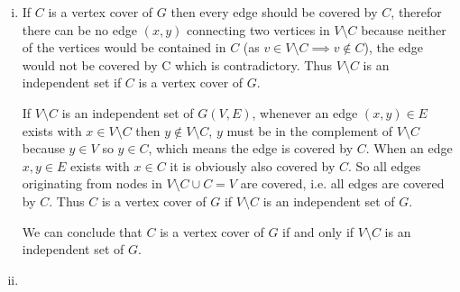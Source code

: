 \begin{enumerate}[(i)]
	\item If $C$ is a vertex cover of $G$ then every edge should be covered by $C$, therefor there can be no edge $(x,y)$ connecting two vertices in $V \setminus C$ because neither of the vertices would be contained in $C$ (as $v \in V \setminus C \implies v \not \in C$), the edge would not be covered by C which is contradictory. Thus $V \setminus C$ is an independent set if $C$ is a vertex cover of $G$.

If $V \setminus C$ is an independent set of $G(V,E)$, whenever an edge $(x,y) \in E$ exists with $x \in V \setminus C$ then $y \not \in V \setminus C$, $y$ must be in the complement of $V \setminus C$ because $y \in V$ so $y \in C$, which means the edge is covered by $C$. When an edge $x,y \in E$ exists with $x \in C$ it is obviously also covered by $C$. So all edges originating from nodes in $V \setminus C \cup C = V$ are covered, i.e. all edges are covered by $C$. Thus $C$ is a vertex cover of $G$ if $V \setminus C$ is an independent set of $G$.

We can conclude that $C$ is a vertex cover of $G$ if and only if $V \setminus C$ is an independent set of $G$.
	\item
\end{enumerate}
